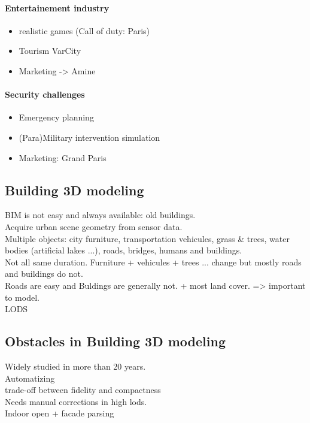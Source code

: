         \paragraph{Entertainement industry}
        \begin{itemize}
            \item realistic games (Call of duty: Paris)
            \item Tourism VarCity
            \item Marketing -> Amine
        \end{itemize}
        \paragraph{Security challenges}
        \begin{itemize}
            \item Emergency planning
            \item (Para)Military intervention simulation
            \item Marketing: Grand Paris
        \end{itemize}
    \subsection{Building 3D modeling}
        BIM is not easy and always available: old buildings.\\
        Acquire urban scene geometry from sensor data.\\
        Multiple objects: city furniture, transportation vehicules, grass \& trees, water bodies (artificial lakes ...), roads, bridges, humans and buildings.\\
        Not all same duration. Furniture + vehicules + trees ... change but mostly roads and buildings do not.\\
        Roads are easy and Buldings are generally not. + most land cover. => important to model.\\
        LODS\\
    \subsection{Obstacles in Building 3D modeling}
        Widely studied in more than 20 years.\\
        Automatizing\\
        trade-off between fidelity and compactness\\
        Needs manual corrections in high lods.\\
        Indoor open + facade parsing\\
